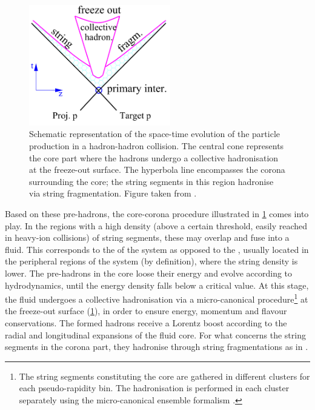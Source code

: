 \begin{figure}[t]
\centering
	\includegraphics[width=0.55\textwidth, valign=t]{Figs/Chapter6/medium.png}
\caption{Schematic representation of the space-time evolution of the particle production in a hadron-hadron collision. The central cone represents the core part where the hadrons undergo a collective hadronisation at the freeze-out surface. The hyperbola line encompasses the corona surrounding the core; the string segments in this region  hadronise via string fragmentation. Figure taken from \cite{pierogEPOSLHCTest2015}.}
	\label{fig:CoreCorona}
\end{figure}

Based on these pre-hadrons, the core-corona procedure illustrated in \fig\ref{fig:CoreCorona} comes into play. In the regions with a high density (above a certain threshold, easily reached in heavy-ion collisions) of string segments, these may overlap and fuse into a fluid. This corresponds to the  of the system as opposed to the , usually located in the peripheral regions of the system (by definition), where the string density is lower. The pre-hadrons in the core loose their energy and evolve according to hydrodynamics, until the energy density falls below a critical value. At this stage, the fluid undergoes a collective hadronisation via a micro-canonical procedure\footnote{The string segments constituting the core are gathered in different clusters for each pseudo-rapidity bin. The hadronisation is performed in each cluster separately using the micro-canonical ensemble formalism \cite{pierogEPOSLHCTest2015}.} at the freeze-out surface (\fig\ref{fig:CoreCorona}), in order to ensure energy, momentum and flavour conservations. The formed hadrons receive a Lorentz boost according to the radial and longitudinal expansions of the fluid core. For what concerns the string segments in the corona part, they hadronise through string fragmentations as in \Pythia.\\

